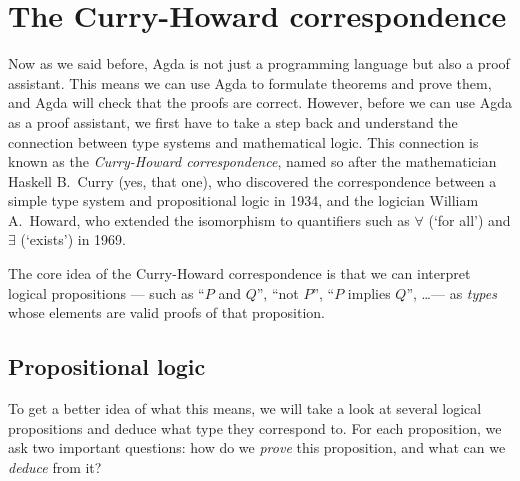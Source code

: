 \documentclass[a4paper,UKenglish]{tufte-handout}
\theoremstyle{definition}
\begin{document}
\section{The Curry-Howard correspondence}


Now as we said before, Agda is not just a programming language but
also a proof assistant. This means we can use Agda to formulate
theorems and prove them, and Agda will check that the proofs are
correct. However, before we can use Agda as a proof assistant, we
first have to take a step back and understand the connection between
type systems and mathematical logic. This connection is known as the
\emph{Curry-Howard correspondence}, named so after the mathematician
Haskell B.~Curry (yes, that one), who discovered the correspondence
between a simple type system and propositional logic in 1934, and the
logician William A.~Howard, who extended the isomorphism to
quantifiers such as $\forall$ (`for all') and $\exists$ (`exists') in
1969.

The core idea of the Curry-Howard correspondence is that we can
interpret logical propositions --- such as ``$P$ and $Q$'', ``not $P$'',
``$P$ implies $Q$'', \ldots --- as \emph{types} whose elements are valid
proofs of that proposition.

\subsection{Propositional logic}

To get a better idea of what this means, we will take a look at
several logical propositions and deduce what type they correspond
to. For each proposition, we ask two important questions: how do we
\emph{prove} this proposition, and what can we \emph{deduce} from it?
\end{document}
